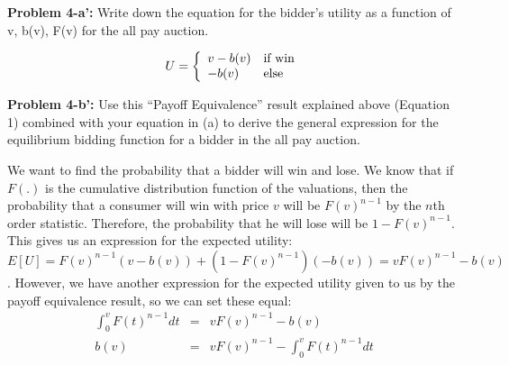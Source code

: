 \documentclass[psamsfonts]{amsart}
\newenvironment{sol}{\vspace{0.25cm}{\large \bfseries Solution:}}{\qedsymbol}
\newenvironment{prob}[1]{\begin{framed}{\large \bfseries Problem #1:}}{\end{framed}}
\begin{document}
\begin{prob}{4-a'}
Write down the equation for the bidder’s utility as a function of v, b(v), F(v) for the all pay auction.
\end{prob}
\begin{sol}
\begin{eqnarray}
U = \left\{ \begin{array}{l l}
v - b(v) & \text{if win} \\
- b(v) & \text{else}
\end{array} \right.
\end{eqnarray}
\end{sol}

\begin{prob}{4-b'}
Use this ``Payoff Equivalence'' result explained above (Equation 1) combined with your equation in (a) to derive the general expression for the equilibrium bidding function for a bidder in the all pay auction.
\end{prob}
\begin{sol}
We want to find the probability that a bidder will win and lose. We know that if $F(.)$ is the cumulative distribution function of the valuations, then the probability that a consumer will win with price $v$ will be $F(v)^{n-1}$ by the $n$th order statistic. Therefore, the probability that he will lose will be $1 - F(v)^{n-1}$. This gives us an expression for the expected utility: $E[U] = F(v)^{n-1} ( v - b(v)) + (1- F(v)^{n-1}) ( - b(v)) = v F(v)^{n-1} - b(v)$. However, we have another expression for the expected utility given to us by the payoff equivalence result, so we can set these equal:
\begin{eqnarray}
\int_0^{v} F(t)^{n-1} dt &=& v F(v)^{n-1} - b(v) \\
b(v) &=& v F(v)^{n-1} - \int_0^v F(t)^{n-1} dt 
\end{eqnarray}
\end{sol}
\end{document}
